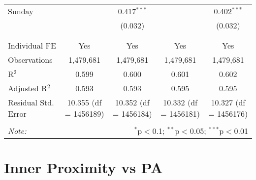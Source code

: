 \documentclass[
]{article}
\begin{document}
\begin{table}[!htbp]
{\begin{tabular}{@{\extracolsep{5pt}}lcccc}
 Sunday &  & 0.417$^{***}$ &  & 0.402$^{***}$ \\ 
  &  & (0.032) &  & (0.032) \\ 
  & & & & \\ 
\hline \\[-1.8ex] 
Individual FE & Yes & Yes & Yes & Yes \\ 
Observations & 1,479,681 & 1,479,681 & 1,479,681 & 1,479,681 \\ 
R$^{2}$ & 0.599 & 0.600 & 0.601 & 0.602 \\ 
Adjusted R$^{2}$ & 0.593 & 0.593 & 0.595 & 0.595 \\ 
Residual Std. Error & 10.355 (df = 1456189) & 10.352 (df = 1456184) & 10.332 (df = 1456181) & 10.327 (df = 1456176) \\ 
\hline 
\hline \\[-1.8ex] 
\textit{Note:}  & \multicolumn{4}{r}{$^{*}$p$<$0.1; $^{**}$p$<$0.05; $^{***}$p$<$0.01} \\ 
\end{tabular}
} 
\end{table} 
\newpage
\section{Inner Proximity vs PA}
\end{document}
